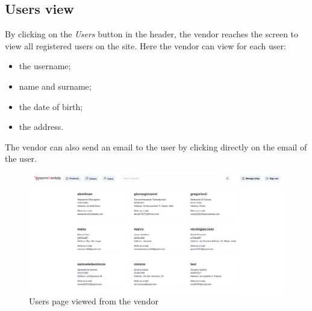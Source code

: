 \subsection{Users view}
By clicking on the \textit{Users} button in the header, the vendor reaches the screen to view all registered users on the site.
Here the vendor can view for each user:
\begin {itemize}
\item the username;
\item name and surname;
\item the date of birth;
\item the address.
\end {itemize}
The vendor can also send an email to the user by clicking directly on the email of the user.
\begin{figure}[!ht]
    \caption{Users page viewed from the vendor}
    \vspace{5px}
    \includegraphics[scale=0.25]{../../../../Images/userManual/usersVendor.png}
    \centering
\end{figure}
\pagebreak
